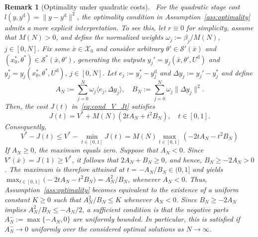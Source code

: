 \documentclass[a4paper,fleqn]{cas-dc}
\newtheorem{rem}{Remark}
\begin{document}
\begin{rem}[Optimality under quadratic costs]\label{rem:optimality_quadratic}
	\, For the quadratic stage cost $l(y,y^{\mathrm d})=\|y-y^{\mathrm d}\|^2$, the optimality condition in Assumption~\ref{ass:optimality} admits a more explicit interpretation.
	To see this, let $r\equiv0$ for simplicity, assume that $M(N)>0$, and define the normalized weights $\omega_j:=\beta_j/M(N)$, $j\in[0,N]$.
	Fix some $\bar{x}\in\mathcal{X}_0$ and consider arbitrary $\theta'\in\mathcal{S}'(\bar{x})$ and $(x_0^*,\theta^*)\in\mathcal{S}^*(\bar{x},\theta')$, generating the outputs $y_j' = y_j(\bar{x},\theta',U^{\mathrm d})$ and $y_j^*=y_j(x_0^*,\theta^*,U^{\mathrm d})$, $j\in[0,N]$.
	Let $e_{j}:=y_j^*-y_j^{\mathrm d}$ and $\Delta y_{j}:=y_j'-y_j^*$ and define
	\begin{equation*}
		A_N:=\sum_{j=0}^N\omega_{j}\langle e_{j},\Delta y_{j}\rangle,
		\quad
		B_N:=\sum_{j=0}^N\omega_{j}\|\Delta y_{j}\|^2.
	\end{equation*}
	Then, the cost $J(t)$ in~\eqref{eq:cond_V_Jt} satisfies%
	\begin{equation*}
		J(t) = V^* + M(N)(2tA_N+t^2B_N),
		\quad t\in[0,1].
	\end{equation*}	
	Consequently,
	\begin{equation*}
		V^*-J(t) \leq V^*-\min_{t\in[0,1]}J(t) = M(N)\max_{t\in[0,1]} (-2tA_N-t^2B_N)
	\end{equation*}
	If $A_N\geq0$, the maximum equals zero.
	Suppose that $A_N<0$. Since $V'(\bar{x})=J(1)\geq V^*$, it follows that $2A_N+B_N\geq0$, and hence, $B_N\geq -2A_N>0$. The maximum is therefore attained at $t=-A_N/B_N\in(0,1]$ and yields $\max_{t\in[0,1]} \bigl(-2tA_N-t^2B_N\bigr) = A_N^2/B_N$, whenever $A_N<0$.
	Thus, Assumption~\ref{ass:optimality} becomes equivalent to the existence of a uniform constant $K\geq0$ such that ${A_N^2}/{B_N}\leq K$ whenever $A_N<0$.
	Since $B_N\geq-2A_N$ implies ${A_N^2}/{B_N}\leq -{A_N}/{2}$, a sufficient condition is that the negative parts $A_N^-:=\max\{-A_N,0\}$ are uniformly bounded. In particular, this is satisfied if $A_N^-\to0$ uniformly over the considered optimal solutions as $N\to\infty$.
	

\end{rem}
\end{document}
